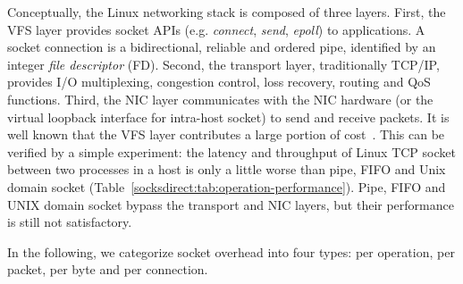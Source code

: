 Conceptually, the Linux networking stack is composed of three layers. First, the VFS layer provides socket APIs (e.g. \emph{connect}, \emph{send}, \emph{epoll}) to applications. A socket connection is a bidirectional, reliable and ordered pipe, identified by an integer \emph{file descriptor} (FD).
Second, the transport layer, traditionally TCP/IP, provides I/O multiplexing, congestion control, loss recovery, routing and QoS functions.
Third, the NIC layer communicates with the NIC hardware (or the virtual loopback interface for intra-host socket) to send and receive packets.
It is well known that the VFS layer contributes a large portion of cost~\cite{clark1989analysis,boyd2010analysis}.
This can be verified by a simple experiment: the latency and throughput of Linux TCP socket between two processes in a host is only a little worse than pipe, FIFO and Unix domain socket (Table~\ref{socksdirect:tab:operation-performance}).
Pipe, FIFO and UNIX domain socket bypass the transport and NIC layers, but their performance is still not satisfactory.

In the following, we categorize socket overhead into four types: per operation, per packet, per byte and per connection.


